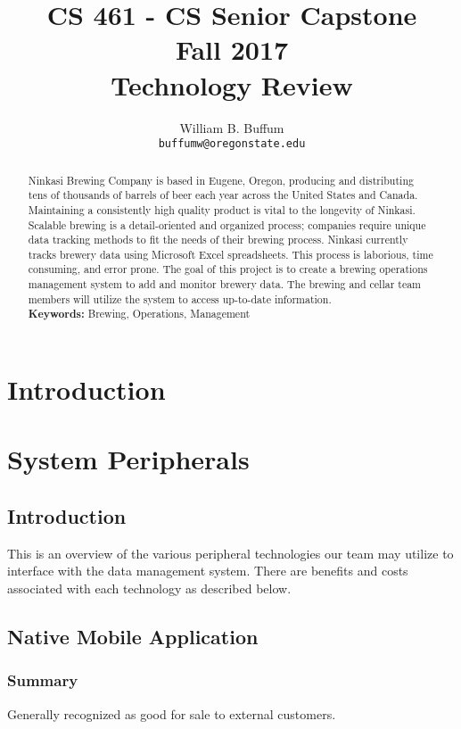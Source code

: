 \documentclass[draftclsnofoot,onecolumn,letterpaper,10pt,compsoc]{IEEEtran}
\title{CS 461 - CS Senior Capstone
	\\Fall 2017
	\\Technology Review
}
\author{
	William B. Buffum \\
	\texttt{buffumw@oregonstate.edu}
}
\begin{document}
\begin{titlingpage}
    \maketitle
    \begin{abstract}
      Ninkasi Brewing Company is based in Eugene, Oregon, producing and distributing tens of thousands of barrels of beer each year across the United States and Canada.
      Maintaining a consistently high quality product is vital to the longevity of Ninkasi.
      Scalable brewing is a detail-oriented and organized process; companies require unique data tracking methods to fit the needs of their brewing process.
      Ninkasi currently tracks brewery data using Microsoft Excel spreadsheets.
      This process is laborious, time consuming, and error prone.
      The goal of this project is to create a brewing operations management system to add and monitor brewery data.
      The brewing and cellar team members will utilize the system to access up-to-date information.
      \\
      \textbf{Keywords:} Brewing, Operations, Management
    \end{abstract}
		\pagebreak
		\tableofcontents
\end{titlingpage}

\section{Introduction}

\section{System Peripherals}
    \subsection{Introduction}
    This is an overview of the various peripheral technologies our team may utilize to interface with the data management system. There are benefits and costs associated with each technology as described below.

	\subsection{Native Mobile Application}
        \subsubsection{Summary}
            Generally recognized as good for sale to external customers.
\end{document}
